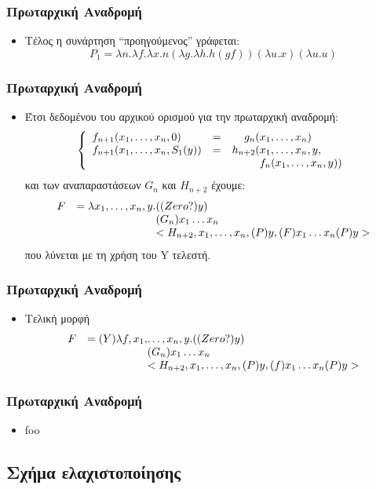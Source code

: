 \documentclass{beamer}
\begin{document}
\begin{frame}
        \frametitle{Πρωταρχική Αναδρομή}
        \begin{itemize}
        	\item Τέλος η συνάρτηση ``προηγούμενος'' γράφεται:
        	$$ P_1 = \lambda n. \lambda f. \lambda x. n (\lambda g. \lambda h. h (g f)) (\lambda u.x) (\lambda u. u) $$
        \end{itemize}
\end{frame}
\begin{frame}
        \frametitle{Πρωταρχική Αναδρομή}
        \begin{itemize}
        	\item Έτσι δεδομένου του αρχικού ορισμού για την πρωταρχική αναδρομή:
                $$\left\{
                    \begin{array}{llr@{}l}
                      f_{n+1}(x_1,\ldots,x_n, 0)     &=&    g_n(&x_1,\ldots,x_n) \\
                      f_{n+1}(x_1,\ldots,x_n, S_1(y))&=&h_{n+2}(&x_1,\ldots,x_n, y ,\\
                                                     & &        &f_n(x_1,\ldots,x_n, y))
                    \end{array}
                \right.$$
                και των αναπαραστάσεων $G_n$ και $H_{n+2}$
                \pause
           		έχουμε:
           		$$ \begin{array}{lr@{}l}
           		F &= \lambda x_1,\ldots ,x_n, y .&((Zero?)y) \\
           		  &                              &(G_n)x_1 \ldots x_n \\
           		  &                              &<H_{n+2},x_1,\ldots,x_n,(P)y,(F)x_1 \ldots x_n (P)y>
           		\end{array}$$
           		\pause
           		που λύνεται με τη χρήση του Y τελεστή.
        \end{itemize}
\end{frame}

\begin{frame}
        \frametitle{Πρωταρχική Αναδρομή}
        \begin{itemize}
        	\item Τελική μορφή
           		$$ \begin{array}{lr@{}l}
           		F &= (Y)\lambda f,x_1,&\ldots ,x_n, y .((Zero?)y) \\
           		  &                                   &(G_n)x_1 \ldots x_n \\
           		  &                                   &<H_{n+2},x_1,\ldots,x_n,(P)y,(f)x_1 \ldots x_n (P)y>
           		\end{array}$$
        \end{itemize}
\end{frame}

\begin{frame}
        \frametitle{Πρωταρχική Αναδρομή}
        \begin{itemize}
        	\item foo
        \end{itemize}
\end{frame}


\subsection{Σχήμα ελαχιστοποίησης}
\end{document}

